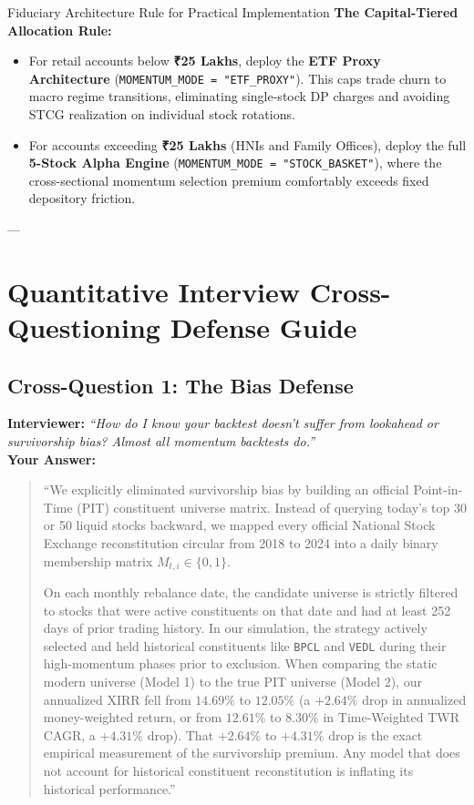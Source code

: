 \documentclass[11pt,a4paper]{article}
\begin{document}
\begin{quantbox}{Fiduciary Architecture Rule for Practical Implementation}
\textbf{The Capital-Tiered Allocation Rule:}
\begin{itemize}[leftmargin=*]
    \item For retail accounts below \textbf{₹25 Lakhs}, deploy the \textbf{ETF Proxy Architecture} (\texttt{MOMENTUM\_MODE = "ETF\_PROXY"}). This caps trade churn to macro regime transitions, eliminating single-stock DP charges and avoiding STCG realization on individual stock rotations.
    \item For accounts exceeding \textbf{₹25 Lakhs} (HNIs and Family Offices), deploy the full \textbf{5-Stock Alpha Engine} (\texttt{MOMENTUM\_MODE = "STOCK\_BASKET"}), where the cross-sectional momentum selection premium comfortably exceeds fixed depository friction.
\end{itemize}
\end{quantbox}

---

\section{Quantitative Interview Cross-Questioning Defense Guide}

\subsection{Cross-Question 1: The Bias Defense}
\textbf{Interviewer:} \textit{``How do I know your backtest doesn't suffer from lookahead or survivorship bias? Almost all momentum backtests do.''} \\
\textbf{Your Answer:}
\begin{quote}
``We explicitly eliminated survivorship bias by building an official Point-in-Time (PIT) constituent universe matrix. Instead of querying today's top 30 or 50 liquid stocks backward, we mapped every official National Stock Exchange reconstitution circular from 2018 to 2024 into a daily binary membership matrix $M_{t, i} \in \{0, 1\}$. 

On each monthly rebalance date, the candidate universe is strictly filtered to stocks that were active constituents on that date and had at least 252 days of prior trading history. In our simulation, the strategy actively selected and held historical constituents like \texttt{BPCL} and \texttt{VEDL} during their high-momentum phases prior to exclusion. When comparing the static modern universe (Model 1) to the true PIT universe (Model 2), our annualized XIRR fell from $14.69\%$ to $12.05\%$ (a $+2.64\%$ drop in annualized money-weighted return, or from $12.61\%$ to $8.30\%$ in Time-Weighted TWR CAGR, a $+4.31\%$ drop). That $+2.64\%$ to $+4.31\%$ drop is the exact empirical measurement of the survivorship premium. Any model that does not account for historical constituent reconstitution is inflating its historical performance.''
\end{quote}
\end{document}
